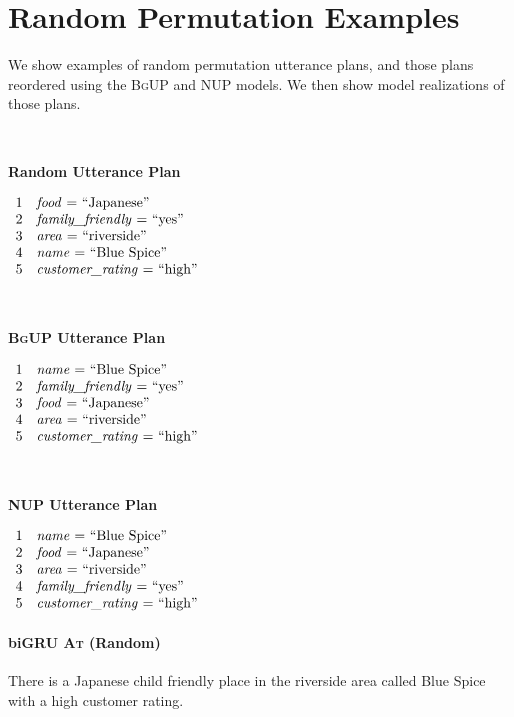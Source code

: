 
\section{Random Permutation Examples}
\label{app:examples}
We show examples of random permutation utterance plans, and those
plans reordered using the \textsc{BgUP} and \textsc{NUP} models.
We then show model realizations of those plans.


~\\


\noindent
\parbox{.333\textwidth}{\textbf{Random Utterance Plan}}
$\begin{array}{ll}
1  &  \textrm{\textit{food} = ``Japanese''} \\
2  &  \textrm{\textit{family\_friendly} = ``yes''} \\
3  &  \textrm{\textit{area} = ``riverside''} \\
4  &  \textrm{\textit{name} = ``Blue Spice''} \\
5  &  \textrm{\textit{customer\_rating} = ``high''} \\
\end{array}$

~\\

\noindent
\parbox{.333\textwidth}{\textbf{\textsc{BgUP} Utterance Plan}}
$\begin{array}{ll}
1  &  \textrm{\textit{name} = ``Blue Spice''} \\
2  &  \textrm{\textit{family\_friendly} = ``yes''} \\
3  &  \textrm{\textit{food} = ``Japanese''} \\
4  &  \textrm{\textit{area} = ``riverside''} \\
5  &  \textrm{\textit{customer\_rating} = ``high''} \\
\end{array}$

~\\

\noindent
\parbox{.333\textwidth}{\textbf{\textsc{NUP} Utterance Plan}}
$\begin{array}{ll}
1  &  \textrm{\textit{name} = ``Blue Spice''} \\
2  &  \textrm{\textit{food} = ``Japanese''} \\
3  &  \textrm{\textit{area} = ``riverside''} \\
4  &  \textrm{\textit{family\_friendly} = ``yes''} \\
5  &  \textrm{\textit{customer\_rating} = ``high''} \\
\end{array}$
\paragraph{biGRU \textsc{At} (Random)}
There is a Japanese child friendly place in the riverside area called Blue Spice with a high customer rating.

